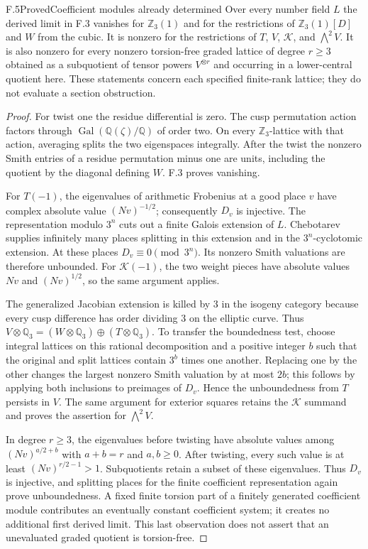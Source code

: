 \begin{statement}{F.5}{Proved}{Coefficient modules already determined}
Over every number field $L$ the derived limit in F.3 vanishes for $\mathbb Z_3(1)$ and for the restrictions of
$\mathbb Z_3(1)[D]$ and $W$ from the cubic.
It is nonzero for the restrictions of $T$, $V$, $\mathcal K$, and $\bigwedge^2V$.
It is also nonzero for every nonzero torsion-free graded lattice of degree $r\ge3$ obtained as a subquotient of tensor powers $V^{\otimes r}$ and occurring in a lower-central quotient here.
These statements concern each specified finite-rank lattice; they do not evaluate a section obstruction.
\end{statement}
\begin{proof}
For twist one the residue differential is zero. The cusp permutation action factors through $\operatorname{Gal}(\mathbb Q(\zeta)/\mathbb Q)$ of order two. On every $\mathbb Z_3$-lattice with that action, averaging splits the two eigenspaces integrally. After the twist the nonzero Smith entries of a residue permutation minus one are units, including the quotient by the diagonal defining $W$. F.3 proves vanishing.

For $T(-1)$, the eigenvalues of arithmetic Frobenius at a good place $v$ have complex absolute value $(Nv)^{-1/2}$; consequently $D_v$ is injective. The representation modulo $3^n$ cuts out a finite Galois extension of $L$. Chebotarev supplies infinitely many places splitting in this extension and in the $3^n$-cyclotomic extension. At these places $D_v\equiv0\pmod{3^n}$. Its nonzero Smith valuations are therefore unbounded. For $\mathcal K(-1)$, the two weight pieces have absolute values $Nv$ and $(Nv)^{1/2}$, so the same argument applies.

The generalized Jacobian extension is killed by $3$ in the isogeny category because every cusp difference has order dividing $3$ on the elliptic curve. Thus
$V\otimes\mathbb Q_3=(W\otimes\mathbb Q_3)\oplus(T\otimes\mathbb Q_3)$.
To transfer the boundedness test, choose integral lattices on this rational decomposition and a positive integer $b$ such that the original and split lattices contain $3^b$ times one another. Replacing one by the other changes the largest nonzero Smith valuation by at most $2b$; this follows by applying both inclusions to preimages of $D_v$. Hence the unboundedness from $T$ persists in $V$. The same argument for exterior squares retains the $\mathcal K$ summand and proves the assertion for $\bigwedge^2V$.

In degree $r\ge3$, the eigenvalues before twisting have absolute values among $(Nv)^{a/2+b}$ with $a+b=r$ and $a,b\ge0$. After twisting, every such value is at least $(Nv)^{r/2-1}>1$. Subquotients retain a subset of these eigenvalues. Thus $D_v$ is injective, and splitting places for the finite coefficient representation again prove unboundedness. A fixed finite torsion part of a finitely generated coefficient module contributes an eventually constant coefficient system; it creates no additional first derived limit. This last observation does not assert that an unevaluated graded quotient is torsion-free.
\end{proof}
